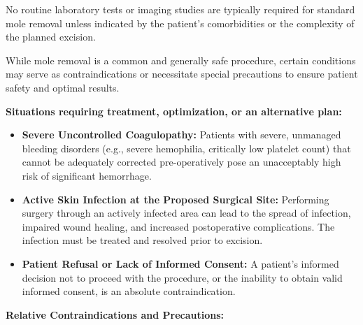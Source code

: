 No routine laboratory tests or imaging studies are typically required for standard mole removal unless indicated by the patient's comorbidities or the complexity of the planned excision.

While mole removal is a common and generally safe procedure, certain conditions may serve as contraindications or necessitate special precautions to ensure patient safety and optimal results.

\textbf{Situations requiring treatment, optimization, or an alternative plan:}

\begin{itemize}
  \item \textbf{Severe Uncontrolled Coagulopathy:} Patients with severe, unmanaged bleeding disorders (e.g., severe hemophilia, critically low platelet count) that cannot be adequately corrected pre-operatively pose an unacceptably high risk of significant hemorrhage.
  
  \item \textbf{Active Skin Infection at the Proposed Surgical Site:} Performing surgery through an actively infected area can lead to the spread of infection, impaired wound healing, and increased postoperative complications. The infection must be treated and resolved prior to excision.
  
  \item \textbf{Patient Refusal or Lack of Informed Consent:} A patient's informed decision not to proceed with the procedure, or the inability to obtain valid informed consent, is an absolute contraindication.
\end{itemize}

\textbf{Relative Contraindications and Precautions:}


